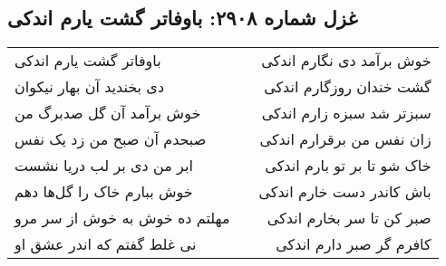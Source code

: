 \begin{center}
\section*{غزل شماره ۲۹۰۸: باوفاتر گشت یارم اندکی}
\label{sec:2908}
\begin{longtable}{l p{0.5cm} r}
باوفاتر گشت یارم اندکی
&&
خوش برآمد دی نگارم اندکی
\\
دی بخندید آن بهار نیکوان
&&
گشت خندان روزگارم اندکی
\\
خوش برآمد آن گل صدبرگ من
&&
سبزتر شد سبزه زارم اندکی
\\
صبحدم آن صبح من زد یک نفس
&&
زان نفس من برقرارم اندکی
\\
ابر من دی بر لب دریا نشست
&&
خاک شو تا بر تو بارم اندکی
\\
خوش ببارم خاک را گل‌ها دهم
&&
باش کاندر دست خارم اندکی
\\
مهلتم ده خوش به خوش از سر مرو
&&
صبر کن تا سر بخارم اندکی
\\
نی غلط گفتم که اندر عشق او
&&
کافرم گر صبر دارم اندکی
\\
\end{longtable}
\end{center}
